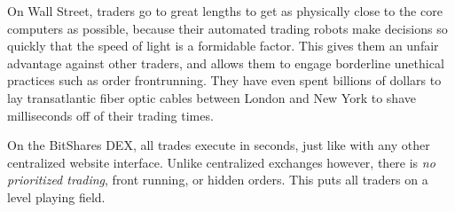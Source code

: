 On Wall Street, traders go to great lengths to get as physically close to the
core computers as possible, because their automated trading robots make
decisions so quickly that the speed of light is a formidable factor. This gives
them an unfair advantage against other traders, and allows them to engage
borderline unethical practices such as order frontrunning. They have even spent
billions of dollars to lay transatlantic fiber optic cables between London and
New York to shave milliseconds off of their trading times.

On the BitShares DEX, all trades execute in seconds, just like with any other
centralized website interface. Unlike centralized exchanges however, there is
\emph{no prioritized trading}, front running, or hidden orders. This puts all
traders on a level playing field.
